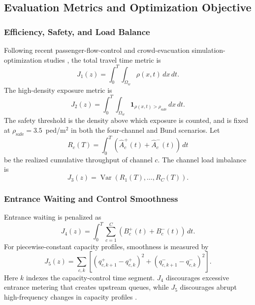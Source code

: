 \documentclass[lettersize,journal]{IEEEtran}
\begin{document}
\subsection{Evaluation Metrics and Optimization Objective}
\label{sec:metrics}

\subsubsection{Efficiency, Safety, and Load Balance}

Following recent passenger-flow-control and crowd-evacuation simulation-optimization studies \cite{RN2145,RN2119,hu2025passenger_capacity_allocation}, the total travel time metric is
\begin{equation}
J_1(z) = \int_0^T \int_{\Omega_w} \rho(x,t) \, dx \, dt.
\label{eq:j1}
\end{equation}
The high-density exposure metric is
\begin{equation}
J_2(z) = \int_0^T \int_{\Omega_w} \mathbf{1}_{\rho(x,t) > \rho_{\text{safe}}} \, dx \, dt.
\label{eq:j2}
\end{equation}
The safety threshold is the density above which exposure is counted, and is fixed at $\rho_{\text{safe}}=3.5$~ped/m$^2$ in both the four-channel and Bund scenarios.
Let
\begin{equation}
R_c(T)=\int_0^T(\hat A_c^+(t)+\hat A_c^-(t))\,dt
\label{eq:channel_throughput}
\end{equation}
be the realized cumulative throughput of channel $c$.
The channel load imbalance is
\begin{equation}
J_3(z) = \operatorname{Var}(R_1(T), \dots, R_C(T)).
\label{eq:j3}
\end{equation}

\subsubsection{Entrance Waiting and Control Smoothness}

Entrance waiting is penalized as
\begin{equation}
J_4(z)=\int_0^T\sum_{c=1}^{C}\left(B_c^+(t)+B_c^-(t)\right)\,dt.
\label{eq:j4}
\end{equation}
For piecewise-constant capacity profiles, smoothness is measured by
\begin{equation}
J_5(z)=\sum_{c,k}\left[(q_{c,k+1}^+-q_{c,k}^+)^2+(q_{c,k+1}^--q_{c,k}^-)^2\right].
\label{eq:j5}
\end{equation}
Here $k$ indexes the capacity-control time segment.
$J_4$ discourages excessive entrance metering that creates upstream queues, while $J_5$ discourages abrupt high-frequency changes in capacity profiles \cite{RN2196,jiang2018coordinated_inflow,liu2021queuing_network_flow_control,hu2025passenger_capacity_allocation}.
\end{document}
